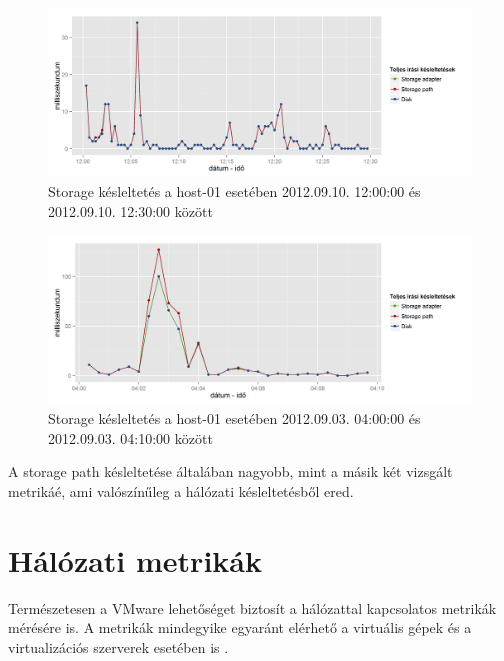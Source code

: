 \documentclass[a4paper,10pt,titlepage]{article}
\begin{document}
\begin{figure}[h!]
\centering
\includegraphics[width=1.00\textwidth]{figures/disk_metrics_storage_latency-20120910120000-20120910123000.png}
\caption{ Storage késleltetés a host-01 esetében 2012.09.10. 12:00:00 és 2012.09.10. 12:30:00 között \label{fig:disk_metrics_storage_latency-02}}
\end{figure}

\begin{figure}[h!]
\centering
\includegraphics[width=1.00\textwidth]{figures/disk_metrics_storage_latency-20120903040000-20120903041000.png}
\caption{ Storage késleltetés a host-01 esetében 2012.09.03. 04:00:00 és 2012.09.03. 04:10:00 között \label{fig:disk_metrics_storage_latency-03}}
\end{figure}

A storage path késleltetése általában nagyobb, mint a másik két vizsgált metrikáé, ami valószínűleg a hálózati késleltetésből ered.


\section{Hálózati metrikák}

Természetesen a VMware lehetőséget biztosít a hálózattal kapcsolatos metrikák mérésére is. A metrikák mindegyike egyaránt elérhető a virtuális gépek és a virtualizációs szerverek esetében is \cite{link:NC}.
\end{document}
